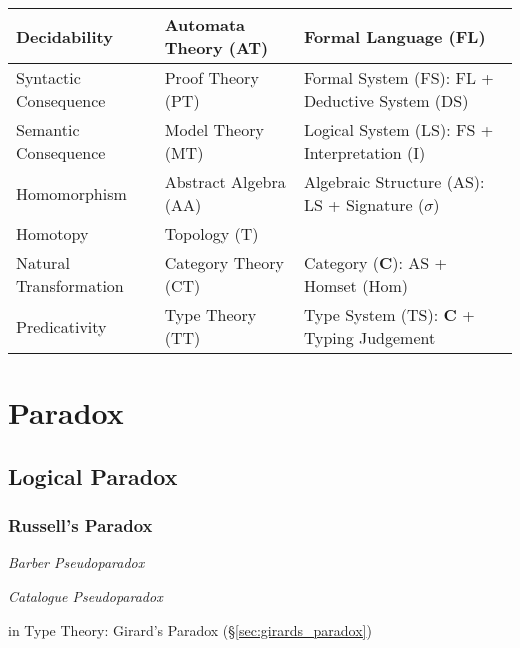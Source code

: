 \begin{tabularx}{\textwidth}{| X | X | X |}
    \hline
    Decidability            & Automata Theory (AT)  & Formal Language (FL) \\
    \hline
    Syntactic Consequence   & Proof Theory (PT)     & Formal System (FS): FL + Deductive System (DS) \\
    \hline
    Semantic Consequence    & Model Theory (MT)     & Logical System (LS): FS + Interpretation (I) \\
    \hline
    Homomorphism            & Abstract Algebra (AA) & Algebraic Structure (AS): LS + Signature ($\sigma$) \\
    \hline
    Homotopy                & Topology (T)          & \\
    \hline
    Natural Transformation  & Category Theory (CT)  & Category ($\mathbf{C}$): AS + Homset (Hom) \\
    \hline
    Predicativity           & Type Theory (TT)      & Type System (TS): $\mathbf{C}$ + Typing Judgement \\
    \hline
\end{tabularx}



\section{Paradox}\label{sec:paradox}

\subsection{Logical Paradox}\label{sec:logical_paradox}
\cite{curry77}

\subsubsection{Russell's Paradox}\label{sec:russells_paradox}

\emph{Barber Pseudoparadox}

\emph{Catalogue Pseudoparadox}

in Type Theory: Girard's Paradox (\S\ref{sec:girards_paradox})



